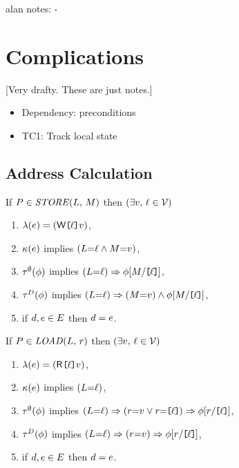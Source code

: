 alan notes:
-

\section{Complications}

[Very drafty.  These are just notes.]

\begin{itemize}
\item Dependency: preconditions
\item TC1: Track local state
\end{itemize}

\subsection{Address Calculation}
 
\begin{definition}
  \noindent
  If $\aPS\SB0 \in \sSTORE{\cExp}{\aExp}$ then
  $(\exists\aVal,\,\cVal\in\Val)$
  \begin{enumerate}
  \item $\labelingAct\SB0(\aEv) = \DWP{\REF\cVal}{\aVal}$,
  \item $\labelingForm\SB0(\aEv)$ implies $(\cExp{=}\cVal \land \aExp{=}\aVal)$,
  \item $\aTr[\emptyset]\SB0(\aForm)$ implies $(\cExp{=}\cVal) \limplies \aForm[\aExp/\REF{\cVal}]$,
  \item $\aTr[\bEvs]\SB0(\aForm)$ implies $(\cExp{=}\cVal) \limplies (\aExp{=}\aVal) \land \aForm[\aExp/\REF{\cVal}]$, 
  \item if $\bEv,\aEv\in\aEvs\SB0$ then $\bEv=\aEv$.
  \end{enumerate}

  \noindent
  If $\aPS\SB0 \in \sLOAD{\cExp}{\aReg}$ then
  $(\exists\aVal,\,\cVal\in\Val)$
  \begin{enumerate}
  \item $\labelingAct\SB0(\aEv) = \DRP{\REF{\cVal}}{\aVal}$,
  \item $\labelingForm\SB0(\aEv)$ implies $(\cExp{=}\cVal)$,
  \item $\aTr[\emptyset]\SB0(\aForm)$ implies
    $(\cExp{=}\cVal) \limplies (\aReg{=}\aVal\lor\aReg{=}\REF{\cVal})\limplies\aForm[\aReg/\REF{\cVal}]$,
  \item $\aTr[\bEvs]\SB0(\aForm)$ implies
    $(\cExp{=}\cVal) \limplies (\aReg{=}\aVal)\limplies\aForm[\aReg/\REF{\cVal}]$, 
  \item if $\bEv,\aEv\in\aEvs\SB0$ then $\bEv=\aEv$.
  \end{enumerate}  
\end{definition}

